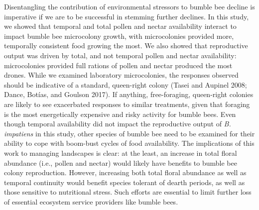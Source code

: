 \documentclass[11pt,]{article}
\begin{document}
Disentangling the contribution of environmental stressors to bumble bee
decline is imperative if we are to be successful in stemming further
declines. In this study, we showed that temporal and total pollen and
nectar availability interact to impact bumble bee microcolony growth,
with microcolonies provided more, temporally consistent food growing the
most. We also showed that reproductive output was driven by total, and
not temporal pollen and nectar availability: microcolonies provided full
rations of pollen and nectar produced the most drones. While we examined
laboratory microcolonies, the responses observed should be indicative of
a standard, queen-right colony (Tasei and Aupinel 2008; Dance, Botías,
and Goulson 2017). If anything, free-foraging, queen-right colonies are
likely to see exacerbated responses to similar treatments, given that
foraging is the most energetically expensive and risky activity for
bumble bees. Even though temporal availability did not impact the
reproductive output of \emph{B. impatiens} in this study, other species
of bumble bee need to be examined for their ability to cope with
boom-bust cycles of food availability. The implications of this work to
managing landscapes is clear: at the least, an increase in total floral
abundance (i.e., pollen and nectar) would likely have benefits to bumble
bee colony reproduction. However, increasing both total floral abundance
as well as temporal continuity would benefit species tolerant of dearth
periods, as well as those sensitive to nutritional stress. Such efforts
are essential to limit further loss of essential ecosystem service
providers like bumble bees.

\newpage
\end{document}
